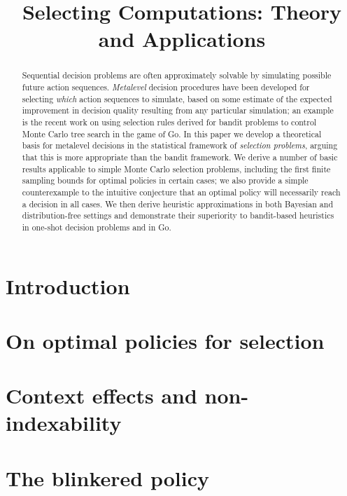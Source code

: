 \documentclass[]{article}
\title{Selecting Computations: Theory and Applications}
\author{}
\begin{document}
\maketitle 

\begin{abstract}
Sequential decision problems are often approximately solvable by
simulating possible future action sequences.  {\em Metalevel} decision
procedures have been developed for selecting {\em which} action
sequences to simulate, based on some estimate of the expected
improvement in decision quality resulting from any particular
simulation; an example is the recent work on using selection rules
derived for bandit problems to control Monte Carlo tree search in the
game of Go.  In this paper we develop a theoretical basis for
metalevel decisions in the statistical framework of {\em selection problems}, 
arguing that this is more appropriate than the bandit
framework.  We derive a number of basic results applicable to simple
Monte Carlo selection problems, including the first finite sampling
bounds for optimal policies in certain cases; we also provide a simple
counterexample to the intuitive conjecture that an optimal policy will
necessarily reach a decision in all cases.  We then derive heuristic
approximations in both Bayesian and distribution-free settings and
demonstrate their superiority to bandit-based heuristics in one-shot
decision problems and in Go.
\end{abstract}


\section{Introduction}




\section{On optimal policies for selection}\label{sec:optimal}




\section{Context effects and non-indexability}\label{sec:context}




\section{The blinkered policy}\label{sec:blinkered}\label{approx-bayesian-section}
\end{document}
